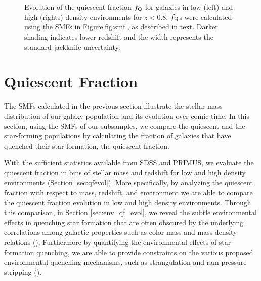 \documentclass{emulateapj}
\begin{document}
\begin{figure*}
    \begin{center}
        \leavevmode
        \caption{Evolution of the quiescent fraction $f_{\rm{Q}}$ for galaxies in low (left) and high (rights) density environments for $z < 0.8$. $f_{\rm{Q}}$s were calculated using the SMFs in Figure\ref{fig:smf}, as described in text. Darker shading indicates lower redshift and the width represents the standard jackknife uncertainty.}         \label{fig:qf}
    \end{center}
\end{figure*}
\section{Quiescent Fraction} \label{sec:qf_const}
The SMFs calculated in the previous section illustrate the stellar mass distribution of our galaxy population and its evolution over comic time. In this section, using the SMFs of our subsamples, we compare the quiescent and the star-forming populations by calculating the fraction of galaxies that have quenched their star-formation, the quiescent fraction. 

With the sufficient statistics available from SDSS and PRIMUS, we evaluate the quiescent fraction in bins of stellar mass and redshift for low and high density environments (Section \ref{sec:qfevol}). More specifically, by analyzing the quiescent fraction with respect to mass, redshift, and environment we are able to compare the quiescent fraction evolution in low and high density environments. Through this comparison, in Section \ref{sec:env_qf_evol}, we reveal the subtle environmental effects in quenching star formation that are often obscured by the underlying correlations among galactic properties such as color-mass and mass-density relations (\cite{Cooper:2010aa}). Furthermore by quantifying the environmental effects of star-formation quenching, we are able to provide constraints on the various proposed environmental quenching mechanisms, such as strangulation and ram-pressure stripping (\cite{McCarthy:2008aa}).
\end{document}
